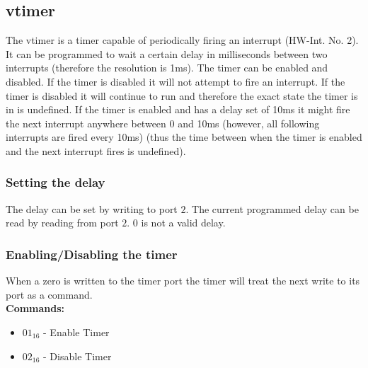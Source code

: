 \subsection{vtimer}

The vtimer is a timer capable of periodically firing an interrupt (HW-Int. No. 2). It can be programmed to wait a certain delay in milliseconds
between two interrupts (therefore the resolution is 1ms). The timer can be enabled and disabled. If the timer is disabled
it will not attempt to fire an interrupt. If the timer is disabled it will continue to run and therefore the exact state the timer is in
is undefined. If the timer is enabled and has a delay set of 10ms it might fire the next interrupt anywhere between 0 and 10ms (however, all following
interrupts are fired every 10ms) (thus the time between when the timer is enabled and the next interrupt fires is undefined). 

\subsubsection{Setting the delay}

The delay can be set by writing to port $2$. The current programmed delay can be read by reading from port $2$. $0$ is not a valid delay.

\subsubsection{Enabling/Disabling the timer}

When a zero is written to the timer port the timer will treat the next write to its port as a command. \\

\textbf{Commands:}
\begin{itemize}
	\item $01_{16}$ - Enable Timer
	\item $02_{16}$ - Disable Timer
\end{itemize}
